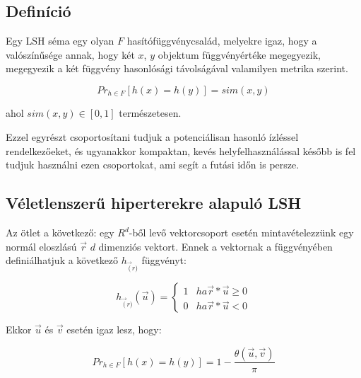 \documentclass[final, 12pt] {ubb_dolgozat}{book}
\begin{document}
\subsection{Definíció}
\label{sec:org7f8d24c}
Egy LSH séma egy olyan \(F\) hasítófüggvénycsalád, melyekre igaz, hogy a valószínűsége annak,
hogy két \(x\), \(y\) objektum függvényértéke megegyezik, megegyezik a két függvény hasonlósági távolságával valamilyen metrika szerint. \citep{charikarSimilarityEstimationTechniques}

\begin{equation}
Pr_{h \in F} [h(x) = h(y)] = sim(x, y)
\end{equation}

ahol \(sim(x,y) \in [0,1]\) természetesen.

Ezzel egyrészt csoportosítani tudjuk a potenciálisan hasonló ízléssel rendelkezőeket, és ugyanakkor kompaktan, kevés helyfelhasználással később is fel tudjuk használni ezen csoportokat, ami segít a futási időn is persze.

\subsection{Véletlenszerű hiperterekre alapuló LSH}
\label{sec:org83841f3}
Az ötlet a következő: egy \(R^{d}\)-ből levő vektorcsoport esetén mintavételezzünk egy normál eloszlású \(\overrightarrow{r}\) \(d\) dimenziós vektort. Ennek a vektornak a függvényében definiálhatjuk a következő \(h_{\overrightarrow(r)}\) függvényt:

\begin{equation}
h_{\overrightarrow(r)} (\overrightarrow{u})= \begin{cases}
                                                1 & ha \overrightarrow{r} * \overrightarrow{u} \ge 0 \\
                                                0 & ha \overrightarrow{r} * \overrightarrow{u} < 0
                                                \end{cases}
\end{equation}


Ekkor \(\overrightarrow{u}\) és \(\overrightarrow{v}\) esetén igaz lesz, hogy:


\begin{equation}
Pr_{h \in F} [h(x) = h(y)] = 1 - \frac{\theta(\overrightarrow{ u }, \overrightarrow{ v })}{\pi}
\end{equation}
\citep{charikarSimilarityEstimationTechniques}
\end{document}
